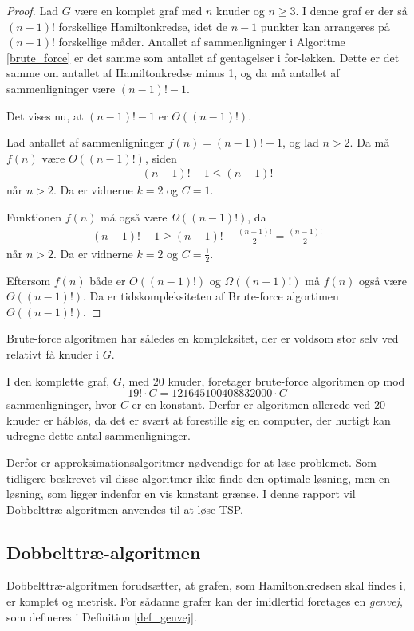 \begin{proof}
	Lad $G$ være en komplet graf med $n$ knuder og $n \geq 3$.
	I denne graf er der så $(n-1)!$ forskellige Hamiltonkredse, idet de $n-1$ punkter kan arrangeres på $(n-1)!$ forskellige måder.
	Antallet af sammenligninger i Algoritme \ref{brute_force} er det samme som antallet af gentagelser i for-løkken.
	Dette er det samme om antallet af Hamiltonkredse minus 1, og da må antallet af sammenligninger være $(n-1)! -1$.  	

	Det vises nu, at $(n-1)! -1$ er $\Theta((n-1)!)$.

	Lad antallet af sammenligninger $f(n) = (n-1)! -1$, og lad $n > 2$.
	Da må $f(n)$ være $O((n-1)!)$, siden
	\begin{align*}
		(n-1)! -1 \leq (n-1)!
	\end{align*}
	når $n>2$. Da er vidnerne $k=2$ og $C=1$.
	
	Funktionen $f(n)$ må også være $\Omega((n-1)!)$, da
	\begin{align*}
		(n-1)! -1 \geq (n-1)! - \frac{(n-1)!}{2} = \frac{(n-1)!}{2}
	\end{align*}
	når $n>2$. Da er vidnerne $k=2$ og $C=\frac{1}{2}$.

	Eftersom $f(n)$ både er $O((n-1)!)$ og $\Omega((n-1)!)$ må $f(n)$ også være $\Theta((n-1)!)$. Da er tidskompleksiteten af Brute-force algortimen $\Theta((n-1)!)$.
\end{proof}

Brute-force algoritmen har således en kompleksitet, der er voldsom stor selv ved relativt få knuder i $G$.

\begin{exmp}
I den komplette graf, $G$, med $20$ knuder, foretager brute-force algoritmen op mod $$19! \cdot C = 121645100408832000 \cdot C$$ sammenligninger, hvor $C$ er en konstant. Derfor er algoritmen allerede ved $20$ knuder er håbløs, da det er svært at forestille sig en computer, der hurtigt kan udregne dette antal sammenligninger.
\end{exmp}

Derfor er approksimationsalgoritmer nødvendige for at løse problemet. Som tidligere beskrevet vil disse algoritmer ikke finde den optimale løsning, men en løsning, som ligger indenfor en vis konstant grænse. I denne rapport vil Dobbelttræ-algoritmen anvendes til at løse TSP. 

\subsection{Dobbelttræ-algoritmen}
Dobbelttræ-algoritmen forudsætter, at grafen, som Hamiltonkredsen skal findes i, er komplet og metrisk. For sådanne grafer kan der imidlertid foretages en \textit{genvej}, som defineres i Definition \ref{def_genvej}.

